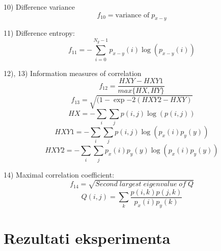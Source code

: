 \documentclass[times, utf8, zavrsni]{fer}
\begin{document}
10) Difference variance
\[
f_{10} = \textrm{variance of} \; p_{x-y}
\]

11) Difference entropy:
\[
f_{11} = -\sum_{i=0}^{N_g-1}p_{x-y}(i)\log(p_{x-y}(i)) 
\]

12), 13) Information measures of correlation
\[
f_{12} = \frac{HXY - HXY1}{max\{HX,HY\}}
\]
\[
f_{13} = \sqrt{(1-\exp{-2(HXY2 - HXY)}}
\]
\[
HX = -\sum_i\sum_j p(i,j)\log(p(i,j))
\]
\[
HXY1 = -\sum_i\sum_j p(i,j)\log(p_x(i)p_y(y))
\]
\[
HXY2 = -\sum_i\sum_j p_x(i)p_y(y) \log(p_x(i)p_y(y))
\]

14) Maximal correlation coefficient:
\[
f_{14} = \sqrt{Second \; largest \; eigenvalue \; of \; Q}
\]
\[
Q(i,j) = \sum_k \frac{p(i,k)p(j,k)}{p_x(i)p_y(k)}
\]

\chapter{Rezultati eksperimenta}
\end{document}
